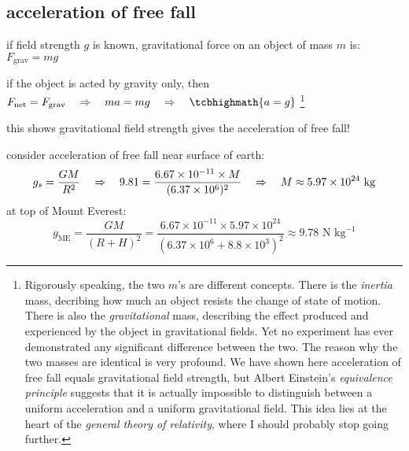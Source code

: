 \subsection{acceleration of free fall}

if field strength $g$ is known, gravitational force on an object of mass $m$ is: $F_\text{grav} = mg$

if the object is acted by gravity only, then $\fnet = F_\text{grav} \RA ma = mg \RA \tcbhighmath{a=g}$
\footnote[][-.1cm]{Rigorously speaking, the two $m$'s are different concepts. There is the \emph{inertia} mass, decribing how much an object resists the change of state of motion. There is also the \emph{gravitational} mass, describing the effect produced and experienced by the object in gravitational fields. Yet no experiment has ever demonstrated any significant difference between the two. The reason why the two masses are identical is very profound. We have shown here acceleration of free fall equals gravitational field strength, but Albert Einstein's \emph{equivalence principle} suggests that it is actually impossible to distinguish between a uniform acceleration and a uniform gravitational field. This idea lies at the heart of the \emph{general theory of relativity}, where I should probably stop going further.}

this shows gravitational field strength gives the acceleration of free fall!


\begin{soln}
    
 consider acceleration of free fall near surface of earth:
\begin{equation*}
	g_s = \frac{GM}{R^2} \quad \Rightarrow \quad 9.81 = \frac{6.67\times10^{-11}\times M}{(6.37\times10^6)^2} \quad \Rightarrow \quad M \approx 5.97\times10^{24} \text{ kg}
\end{equation*}
at top of Mount Everest:
\begin{equation*}
g_\text{ME} = \frac{GM}{(R+H)^2} = \frac{6.67\times10^{-11}\times 5.97\times10^{24}}{(6.37\times10^6+8.8\times10^3)^2} \approx 9.78 \text{ N kg}^{-1} 
\end{equation*}
\end{soln}


